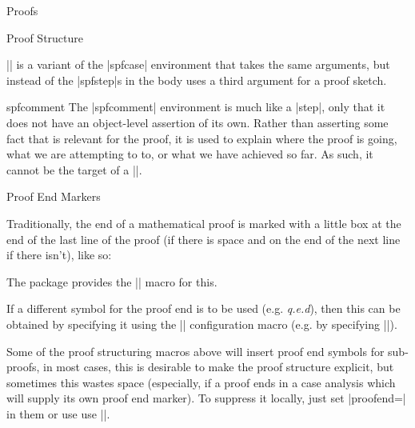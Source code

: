 \begin{sfragment}{Proofs}
\begin{sfragment}{Proof Structure}
  \begin{function}{\spfcasesketch}
    |\spfcasesketch| is a variant of the |spfcase| environment that takes the same
    arguments, but instead of the |spfstep|s in the body uses a third argument for a proof
    sketch.
  \end{function}
  
  \begin{environment}{spfcomment}
    The |spfcomment| environment is much like a |step|, only that it does not have an
    object-level assertion of its own. Rather than asserting some fact that is relevant
    for the proof, it is used to explain where the proof is going, what we are attempting
    to to, or what we have achieved so far. As such, it cannot be the target of a
    |\premise|.
  \end{environment}
\end{sfragment}

\begin{sfragment}{Proof End Markers}

\begin{function}{\sproofend}
  Traditionally, the end of a mathematical proof is marked with a little box at the end of
  the last line of the proof (if there is space and on the end of the next line if there
  isn't), like so:\sproofend

  The  package provides the |\sproofend| macro for this.
\end{function}
  
\begin{variable}{\sProofEndSymbol}
  If a different symbol for the proof end is to be used (e.g. {\sl{q.e.d}}), then this can
  be obtained by specifying it using the |\sProofEndSymbol| configuration macro (e.g. by
  specifying ||).
\end{variable}

  
Some of the proof structuring macros above will insert proof end symbols for sub-proofs,
in most cases, this is desirable to make the proof structure explicit, but sometimes this
wastes space (especially, if a proof ends in a case analysis which will supply its own
proof end marker). To suppress it locally, just set |proofend={}| in them or use use
|\sProofEndSymbol{}|.
\end{sfragment}
\end{sfragment}

